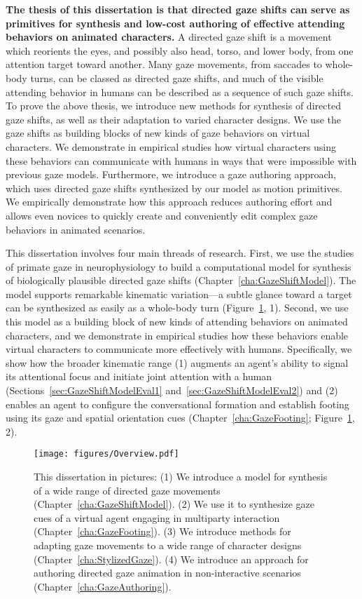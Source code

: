 \textbf{The thesis of this dissertation is that directed gaze shifts can serve as primitives for synthesis and low-cost authoring of effective attending behaviors on animated characters.}
A directed gaze shift is a movement which reorients the eyes, and possibly also head, torso, and lower body, from one attention target toward another. Many gaze movements, from saccades to whole-body turns, can be classed as directed gaze shifts, and much of the visible attending behavior in humans can be described as a sequence of such gaze shifts.
To prove the above thesis, we introduce new methods for synthesis of directed gaze shifts, as well as their adaptation to varied character designs. We use the gaze shifts as building blocks of new kinds of gaze behaviors on virtual characters. We demonstrate in empirical studies how virtual characters using these behaviors can communicate with humans in ways that were impossible with previous gaze models. Furthermore, we introduce a gaze authoring approach, which uses directed gaze shifts synthesized by our model as motion primitives. We empirically demonstrate how this approach reduces authoring effort and allows even novices to quickly create and conveniently edit complex gaze behaviors in animated scenarios.

This dissertation involves four main threads of research. First, we use the studies of primate gaze in neurophysiology to build a computational model for synthesis of biologically plausible directed gaze shifts (Chapter~\ref{cha:GazeShiftModel}). The model supports remarkable kinematic variation---a subtle glance toward a target can be synthesized as easily as a whole-body turn (Figure~\ref{fig:Overview}, 1).
Second, we use this model as a building block of new kinds of attending behaviors on animated characters, and we demonstrate in empirical studies how these behaviors enable virtual characters to communicate more effectively with humans.
Specifically, we show how the broader kinematic range (1) augments an agent's ability to signal its attentional focus and initiate joint attention with a human (Sections~\ref{sec:GazeShiftModelEval1} and~\ref{sec:GazeShiftModelEval2}) and (2) enables an agent to configure the conversational formation and establish footing using its gaze and spatial orientation cues (Chapter~\ref{cha:GazeFooting}; Figure~\ref{fig:Overview}, 2).

\begin{figure}
\centering
\texttt{[image: figures/Overview.pdf]}
\caption{This dissertation in pictures: (1) We introduce a model for synthesis of a wide range of directed gaze movements (Chapter~\ref{cha:GazeShiftModel}). (2) We use it to synthesize gaze cues of a virtual agent engaging in multiparty interaction (Chapter~\ref{cha:GazeFooting}). (3) We introduce methods for adapting gaze movements to a wide range of character designs (Chapter~\ref{cha:StylizedGaze}). (4) We introduce an approach for authoring directed gaze animation in non-interactive scenarios (Chapter~\ref{cha:GazeAuthoring}).}
\label{fig:Overview}
\end{figure}

